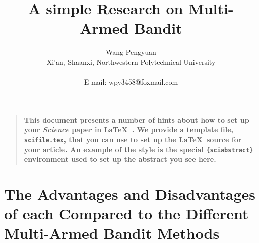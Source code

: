 \documentclass[12pt]{article}
\title{A simple Research on Multi-Armed Bandit}
\author
{Wang Pengyuan\\
	\normalsize{Xi'an, Shaanxi, Northwestern Polytechnical University}\\
	\\
	\normalsize{E-mail: wpy3458@foxmail.com}\\
}
\date{}
\newenvironment{sciabstract}{%
\begin{quote} \bf}
{\end{quote}}
\begin{document}
 
	


\baselineskip24pt


\maketitle 




\begin{sciabstract}
  This document presents a number of hints about how to set up your
  {\it Science\/} paper in \LaTeX\ .  We provide a template file,
  \texttt{scifile.tex}, that you can use to set up the \LaTeX\ source
  for your article.  An example of the style is the special
  \texttt{\{sciabstract\}} environment used to set up the abstract you
  see here.
\end{sciabstract}




\section{The Advantages and Disadvantages of each Compared to the Different Multi-Armed Bandit Methods}
\end{document}
